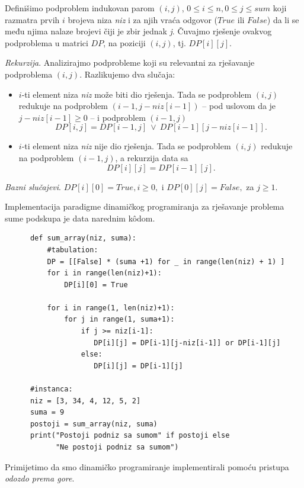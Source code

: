 \begin{solution}
   Definišimo podproblem indukovan parom $(i, j)$, $0 \leq i \leq n, 0 \leq j \leq sum$ koji razmatra prvih $i$ brojeva niza \emph{niz} i za njih vraća odgovor ($True$ ili $False$) da li se među njima nalaze brojevi čiji je zbir jednak \emph{j}. Čuvajmo rješenje ovakvog podproblema u matrici $DP$, na poziciji $(i,j)$, tj. $DP[i][j]$. 
   
   \textit{Rekurzija}. Analizirajmo podprobleme koji su relevantni za rješavanje podproblema $(i,j)$. Razlikujemo dva slučaja:
   \begin{itemize}
   	\item $i$-ti element niza \emph{niz} može biti dio rješenja. Tada se podproblem $(i, j)$ redukuje na podproblem $(i-1, j-niz[i-1])$ -- pod uslovom da je  $j-niz[i-1]\geq  0$ --  i podproblem $(i-1, j)$
   	    $$ DP[i, j] = DP[i-1, j]\ \vee\  DP[i-1][ j- niz[i-1] ]. $$
   	\item $i$-ti element niza \emph{niz} nije dio rješenja. Tada se podproblem $(i, j)$ redukuje na podproblem $(i-1, j)$, a rekurzija data sa 
   	$$ DP[i][j] = DP[i-1][j]. $$

   \end{itemize}
   
   \textit{Bazni slučajevi}. $DP[i][0] = True, i \geq 0,$ i $DP[0][j] = False,$ za $ j \geq 1$. 
   
    Implementacija paradigme dinamičkog programiranja za rješavanje problema sume podskupa je data narednim k\^odom. 
   
   \begin{verbatim}
   	  def sum_array(niz, suma):
   	      #tabulation:
   	      DP = [[False] * (suma +1) for _ in range(len(niz) + 1) ]
   	      for i in range(len(niz)+1):
   	          DP[i][0] = True
   	      
   	      for i in range(1, len(niz)+1):   
   	          for j in range(1, suma+1):
   	              if j >= niz[i-1]:
   	                 DP[i][j] = DP[i-1][j-niz[i-1]] or DP[i-1][j]
   	              else:
   	                 DP[i][j] = DP[i-1][j]
   	  
   	  #instanca:
   	  niz = [3, 34, 4, 12, 5, 2]
   	  suma = 9
   	  postoji = sum_array(niz, suma)
   	  print("Postoji podniz sa sumom" if postoji else  
   	        "Ne postoji podniz sa sumom")
   \end{verbatim}
\end{solution}
Primijetimo da smo dinamičko programiranje implementirali pomoću pristupa \textit{odozdo prema gore}. 

